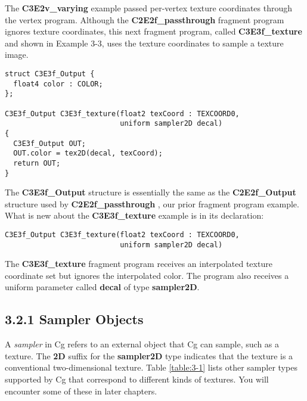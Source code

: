 \documentclass[../main.tex]{subfiles}
\begin{document}
The \textbf{C3E2v_varying} example passed per-vertex texture coordinates through the vertex program. Although the \textbf{C2E2f_passthrough} fragment program ignores texture coordinates, this next fragment program, called \textbf{C3E3f_texture} and shown in Example 3-3, uses the texture coordinates to sample a texture image.

\FloatBarrier
\begin{lstlisting}[caption=Example 3-3. The \textbf{C3E3f_texture} Fragment Program]
struct C3E3f_Output {
  float4 color : COLOR;
};

C3E3f_Output C3E3f_texture(float2 texCoord : TEXCOORD0,
                           uniform sampler2D decal)
{
  C3E3f_Output OUT;
  OUT.color = tex2D(decal, texCoord);
  return OUT;
}
\end{lstlisting}
\FloatBarrier

The \textbf{C3E3f_Output} structure is essentially the same as the \textbf{C2E2f_Output} structure used by \textbf{C2E2f_passthrough} , our prior fragment program example. What is new about the \textbf{C3E3f_texture} example is in its declaration:

\FloatBarrier
\begin{lstlisting}
C3E3f_Output C3E3f_texture(float2 texCoord : TEXCOORD0,
                           uniform sampler2D decal)
\end{lstlisting}
\FloatBarrier

The \textbf{C3E3f_texture} fragment program receives an interpolated texture coordinate set but ignores the interpolated color. The program also receives a uniform parameter called \textbf{decal} of type \textbf{sampler2D}.

\subsection{3.2.1 Sampler Objects}

A \textit{sampler} in Cg refers to an external object that Cg can sample, such as a texture. The \textbf{2D} suffix for the \textbf{sampler2D} type indicates that the texture is a conventional two-dimensional texture. Table \ref{table:3-1} lists other sampler types supported by Cg that correspond to different kinds of textures. You will encounter some of these in later chapters.
\end{document}

